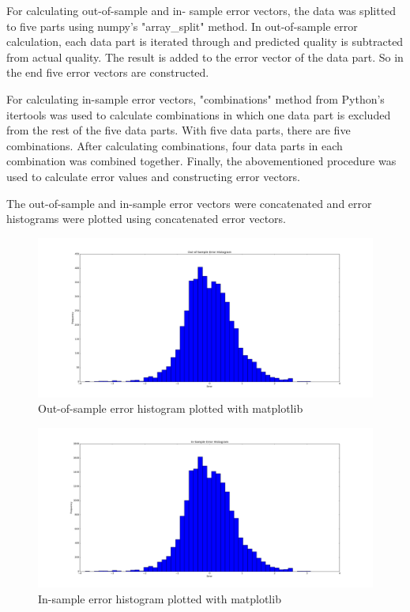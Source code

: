 \documentclass[12pt]{article}
\begin{document}
\vspace{5mm} %

For calculating out-of-sample and in- sample error vectors, the data was splitted to five parts using numpy's "array\_split" method. In out-of-sample error calculation, each data part is iterated through and predicted quality is subtracted from actual quality. The result is added to the error vector of the data part. So in the end five error vectors are constructed.

For calculating in-sample error vectors, "combinations" method from Python's itertools was used to calculate combinations in which one data part is excluded from the rest of the five data parts. With five data parts, there are five combinations. After calculating combinations, four data parts in each combination was combined together. Finally, the abovementioned procedure was used to calculate error values and constructing error vectors.

The out-of-sample and in-sample error vectors were concatenated and error histograms were plotted using concatenated error vectors.

\begin{figure}[H]
    \centering
    \includegraphics[width=1\textwidth]{figures/task1/oos_error_histogram}
    \caption{Out-of-sample error histogram plotted with matplotlib}
    \label{fig:oos_task1}
\end{figure}

\begin{figure}[H]
    \centering
    \includegraphics[width=1\textwidth]{figures/task1/is_error_histogram}
    \caption{In-sample error histogram plotted with matplotlib}
    \label{fig:is_task1}
\end{figure}
\end{document}
